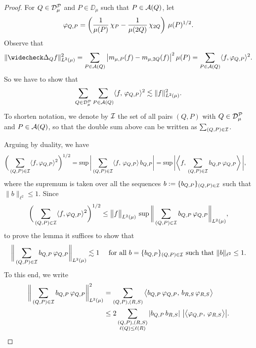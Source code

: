 \begin{proof}
For $Q\in {\mathcal D}_\mu^{\mathcal P}$ and $P\in\DD_\mu$ such that $P\in{\mathcal A}(Q)$, let
$${\varphi}_{Q,P} = \left(\frac1{\mu(P)}\,\chi_P - \frac1{\mu(2Q)}\,\chi_{2Q}\right)\,\mu(P)^{1/2}.$$
Observe that
$$\|\wk\Delta_Q f\|_{L^2(\mu)}^2 = \sum_{P\in\cA(Q)} \big|m_{\mu,P}(f) - m_{\mu,2Q}(f)\big|^2\,\mu(P) 
=\sum_{P\in\cA(Q)}\langle f,\vphi_{Q,P}\rangle^2 .$$
So we have to show that
$$\sum_{Q\in{\mathcal D}_\mu^{\mathcal P}} \sum_{P\in{\mathcal A}(Q)}\langle f,\,{\varphi}_{Q,P}\rangle^2 \lesssim \|f\|_{L^2(\mu)}^2.$$
To shorten notation, we denote by ${\mathcal I}$ the set of all pairs $(Q,P)$ with $Q\in{\mathcal D}_\mu^{\mathcal P}$ and $P\in{\mathcal A}(Q)$, so that 
the double sum above can be written as $\sum_{(Q,P)\in {\mathcal I}}$.

Arguing by duality, we have
\begin{align*}
\bigg(\sum_{(Q,P)\in {\mathcal I}}\langle f,{\varphi}_{Q,P}\rangle^2 \bigg)^{1/2}& =
\sup \bigg| \sum_{(Q,P)\in {\mathcal I}}\langle f,\,{\varphi}_{Q,P}\rangle \,b_{Q,P}\bigg|=  \sup \bigg| \bigg\langle f,\,\sum_{(Q,P)\in {\mathcal I}} b_{Q,P}\,{\varphi}_{Q,P}\bigg\rangle \,\bigg|
,
\end{align*}
where the supremum is taken over all the sequences $b:=\{b_{Q,P}\}_{(Q,P)\in {\mathcal I}}$
such that $\|b\|_{\ell^2}\leq1$.
Since
$$\bigg(\sum_{(Q,P)\in {\mathcal I}}\langle f,{\varphi}_{Q,P}\rangle^2 \bigg)^{1/2} \leq \big\|f\big\|_{L^2(\mu)}\,\sup\bigg\|\sum_{(Q,P)\in {\mathcal I}} b_{Q,P}\,{\varphi}_{Q,P}\bigg\|_{L^2(\mu)},$$
to prove the lemma it suffices to show that
$$\bigg\|\sum_{(Q,P)\in {\mathcal I}} b_{Q,P}\,{\varphi}_{Q,P}\bigg\|_{L^2(\mu)}\lesssim 1\quad\mbox{ for all
$b=\{b_{Q,P}\}_{(Q,P)\in {\mathcal I}}$
such that $\|b\|_{\ell^2}\leq1$.}$$
To this end, we write
\begin{align}\label{eqdobb836}
\bigg\|\sum_{(Q,P)\in {\mathcal I}} b_{Q,P}\,{\varphi}_{Q,P}\bigg\|_{L^2(\mu)}^2 & = 
\sum_{(Q,P),(R,S)}\big\langle b_{Q,P}\,{\varphi}_{Q,P},\, b_{R,S}\,{\varphi}_{R,S}\big\rangle \\
& \le 2
\sum_{\substack{(Q,P),(R,S)\\ \ell(Q)\leq \ell(R)}} |b_{Q,P}\, b_{R,S}| \,\, \big|\big\langle{\varphi}_{Q,P},\, {\varphi}_{R,S}\big\rangle \big|.\nonumber
\end{align}


\end{proof}
